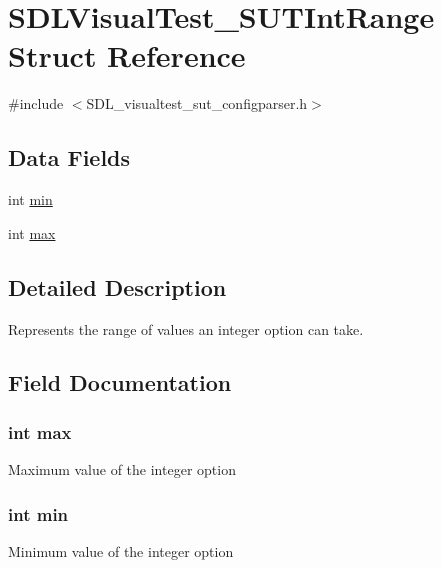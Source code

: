 \hypertarget{struct_s_d_l_visual_test___s_u_t_int_range}{\section{S\-D\-L\-Visual\-Test\-\_\-\-S\-U\-T\-Int\-Range Struct Reference}
\label{struct_s_d_l_visual_test___s_u_t_int_range}
}


{\ttfamily \#include $<$S\-D\-L\-\_\-visualtest\-\_\-sut\-\_\-configparser.\-h$>$}

\subsection*{Data Fields}
\begin{DoxyCompactItemize}
\item 
int \hyperlink{struct_s_d_l_visual_test___s_u_t_int_range_a3e202b201e6255d975cd6d3aff1f5a4d}{min}
\item 
int \hyperlink{struct_s_d_l_visual_test___s_u_t_int_range_ae1e1dde676c120fa6d10f3bb2c14059e}{max}
\end{DoxyCompactItemize}


\subsection{Detailed Description}
Represents the range of values an integer option can take. 

\subsection{Field Documentation}
\hypertarget{struct_s_d_l_visual_test___s_u_t_int_range_ae1e1dde676c120fa6d10f3bb2c14059e}{
\subsubsection[{max}]{\setlength{\rightskip}{0pt plus 5cm}int max}}\label{struct_s_d_l_visual_test___s_u_t_int_range_ae1e1dde676c120fa6d10f3bb2c14059e}
Maximum value of the integer option \hypertarget{struct_s_d_l_visual_test___s_u_t_int_range_a3e202b201e6255d975cd6d3aff1f5a4d}{
\subsubsection[{min}]{\setlength{\rightskip}{0pt plus 5cm}int min}}\label{struct_s_d_l_visual_test___s_u_t_int_range_a3e202b201e6255d975cd6d3aff1f5a4d}
Minimum value of the integer option 

